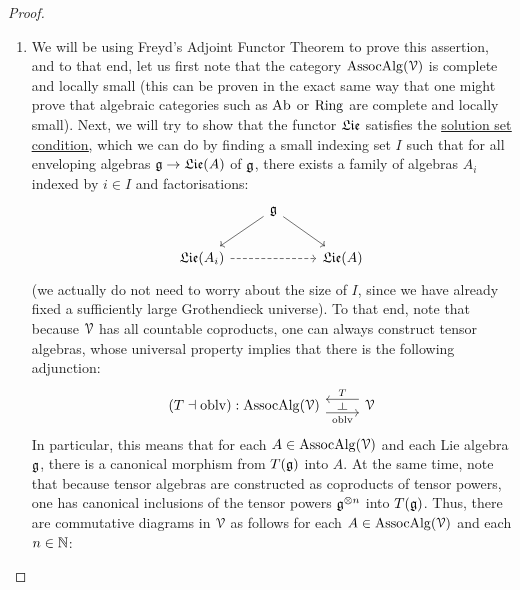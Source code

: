             \begin{proof}
                \noindent
                \begin{enumerate}
                    \item We will be using Freyd's Adjoint Functor Theorem \cite[Theorem V.6.2]{maclane} to prove this assertion, and to that end, let us first note that the category $\mathrm{Assoc}\mathrm{Alg}(\mathcal{V})$ is complete and locally small (this can be proven in the exact same way that one might prove that algebraic categories such as $\mathrm{Ab}$ or $\mathrm{Ring}$ are complete and locally small). Next, we will try to show that the functor $\mathfrak{Lie}$ satisfies the \href{https://ncatlab.org/nlab/show/solution+set+condition}{\underline{solution set condition}}, which we can do by finding a small indexing set $I$ such that for all enveloping algebras $\mathfrak{g} \to \mathfrak{Lie}(A)$ of $\mathfrak{g}$, there exists a family of algebras $A_i$ indexed by $i \in I$ and factorisations:
                        $$
                            \begin{tikzcd}
                            	& {\g} \\
                            	{\frakLie(A_i)} && {\frakLie(A)}
                            	\arrow[from=2-1, to=2-3, dashed]
                            	\arrow["{}"', from=1-2, to=2-1]
                            	\arrow["{}", from=1-2, to=2-3]
                            \end{tikzcd}
                        $$
                    (we actually do not need to worry about the size of $I$, since we have already fixed a sufficiently large Grothendieck universe). To that end, note that because $\mathcal{V}$ has all countable coproducts, one can always construct tensor algebras, whose universal property implies that there is the following adjunction:
                        $$
                            \begin{tikzcd}
                            	{(T \ladjoint \oblv): \Assoc\Alg(\calV)} & {\calV}
                            	\arrow["{\oblv}"{name=0, swap}, from=1-1, to=1-2, shift right=2]
                            	\arrow["{T}"{name=1, swap}, from=1-2, to=1-1, shift right=2]
                            	\arrow["\dashv"{rotate=-90}, from=1, to=0, phantom]
                            \end{tikzcd}
                        $$
                    In particular, this means that for each $A \in \mathrm{Assoc}\mathrm{Alg}(\mathcal{V})$ and each Lie algebra $\mathfrak{g}$, there is a canonical morphism from $T(\mathfrak{g})$ into $A$. At the same time, note that because tensor algebras are constructed as coproducts of tensor powers, one has canonical inclusions of the tensor powers $\g^{\tensor n}$ into $T(\mathfrak{g})$. Thus, there are commutative diagrams in $\mathcal{V}$ as follows for each $A \in \mathrm{Assoc}\mathrm{Alg}(\mathcal{V})$ and each $n \in \mathbb{N}$:

\end{enumerate}
\end{proof}
